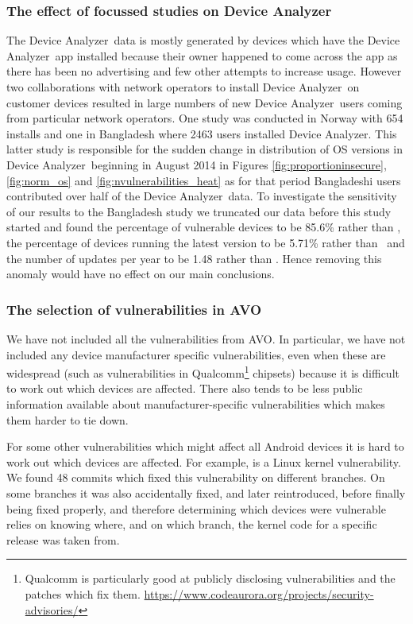 \documentclass{llncs}
\makeatletter
\newcommand{\da}{Device Analyzer}
\newcommand{\avo}{AVO}
\def\avovuln{\@ifnextchar[{\@avovulnsspecific}{\@avovulngeneral}}
\def\@avovulnsspecific[#1]#2{\emph{\href{http://androidvulnerabilities.org/vulnerabilities/#1}{#2}}}
\def\@avovulngeneral#1{\emph{\href{http://androidvulnerabilities.org/vulnerabilities/#1}{#1}}}
\makeatother
\begin{document}
\subsubsection{The effect of focussed studies on \da}
\label{sec:da_changes}
The \da\ data is mostly generated by devices which have the \da\ app installed because their owner happened to come across the app as there has been no advertising and few other attempts to increase usage.
However two collaborations with network operators to install \da\ on customer devices resulted in large numbers of new \da\ users coming from particular network operators.
One study was conducted in Norway with 654 installs and one in Bangladesh where 2463 users installed \da.
This latter study is responsible for the sudden change in distribution of OS versions in \da\ beginning in August 2014 in Figures \ref{fig:proportioninsecure}, \ref{fig:norm_os} and \ref{fig:nvulnerabilities_heat} as for that period Bangladeshi users contributed over half of the \da\ data.
To investigate the sensitivity of our results to the Bangladesh study we truncated our data before this study started and found the percentage of vulnerable devices to be 85.6\% rather than \daMeanInsecurityPercNominal, the percentage of devices running the latest version to be 5.71\% rather than \daUpdatednessPercNominal\ and the number of updates per year to be 1.48 rather than \daUpdatesPerYearNominal.
Hence removing this anomaly would have no effect on our main conclusions.

\subsubsection{The selection of vulnerabilities in \avo}
We have not included all the vulnerabilities from \avo. 
In particular, we have not included any device manufacturer specific vulnerabilities, even when these are widespread (such as vulnerabilities in Qualcomm\footnote{Qualcomm is particularly good at publicly disclosing vulnerabilities and the patches which fix them. \url{https://www.codeaurora.org/projects/security-advisories/}} chipsets) because it is difficult to work out which devices are affected.
There also tends to be less public information available about manufacturer-specific vulnerabilities which makes them harder to tie down.

For some other vulnerabilities which might affect all Android devices it is hard to work out which devices are affected.
For example, \avovuln[pty_race]{pty race} is a Linux kernel vulnerability. We found 48 commits which fixed this vulnerability on different branches. On some branches it was also accidentally fixed, and later reintroduced, before finally being fixed properly, and therefore determining which devices were vulnerable relies on knowing where, and on which branch, the kernel code for a specific release was taken from.
\end{document}
